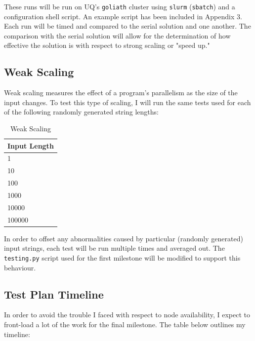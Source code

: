 These runs will be run on UQ's \lstinline{goliath} cluster using \lstinline{slurm} (\lstinline{sbatch}) and a configuration shell script. An example script has been included in Appendix 3. Each run will be timed and compared to the serial solution and one another. The comparison with the serial solution will allow for the determination of how effective the solution is with respect to strong scaling or "speed up."

\subsection{Weak Scaling}
Weak scaling measures the effect of a program's parallelism as the size of the input changes. To test this type of scaling, I will run the same tests used for each of the following randomly generated string lengths:

\begin{table}[H]
\centering
\begin{tabular}{|l|}
\hline
\textbf{Input Length} \\ \hline
1 \\ \hline
10 \\ \hline
100 \\ \hline
1000 \\ \hline
10000 \\ \hline
100000 \\ \hline
\end{tabular}
\caption{Weak Scaling}
\label{tab:weak}
\end{table}

In order to offset any abnormalities caused by particular (randomly generated) input strings, each test will be run multiple times and averaged out. The \lstinline{testing.py} script used for the first milestone will be modified to support this behaviour.


\subsection{Test Plan Timeline}
In order to avoid the trouble I faced with respect to node availability, I expect to front-load a lot of the work for the final milestone. The table below outlines my timeline:

